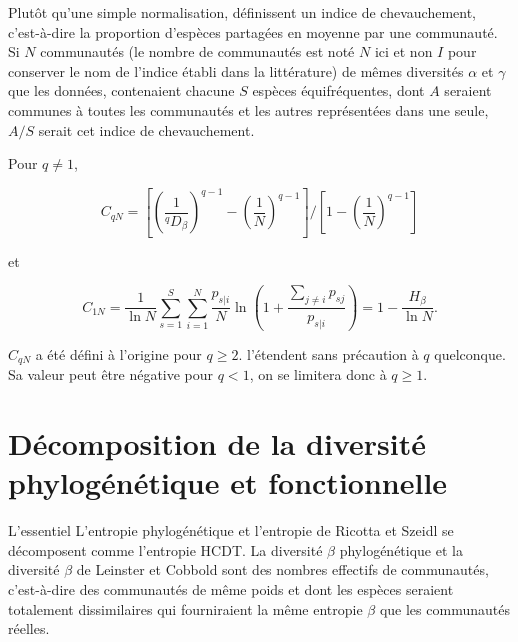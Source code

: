 \documentclass[
  11pt,
  french,
  a4paper,
  extrafontsizes,onecolumn,openright
  ]{memoir}
\newenvironment{Summary}
  {\begin{bclogo}[logo=\bctrombone, noborder=true, couleur=lightgray!50]{L'essentiel}\parindent0pt}
  {\end{bclogo}}
\begin{document}
Plutôt qu'une simple normalisation, \textcite{Chao2008} définissent un indice de chevauchement, c'est-à-dire la proportion d'espèces partagées en moyenne par une communauté.
Si \(N\) communautés (le nombre de communautés est noté \(N\) ici et non \(I\) pour conserver le nom de l'indice établi dans la littérature) de mêmes diversités \(\alpha\) et \(\gamma\) que les données, contenaient chacune \(S\) espèces équifréquentes, dont \(A\) seraient communes à toutes les communautés et les autres représentées dans une seule, \(A/S\) serait cet indice de chevauchement.

Pour \(q\ne 1\),

\begin{equation}
  \label{eq:Chao2008q}
  C_{qN} = {\left[{\left(\frac{1}{^{q}\!D_{\beta}}\right)}^{q-1}-{\left(\frac{1}{N}\right)}^{q-1}\right]}/{\left[1-{\left(\frac{1}{N}\right)}^{q-1}\right]}
\end{equation}

et

\begin{equation}
  \label{eq:C1N}
  C_{1N} 
  =\frac{1}{\ln{N}}\sum^S_{s=1}{\sum^N_{i=1}{\frac{p_{s|i}}{N}\ln\left(1+\frac{\sum_{j\ne i}{p_{sj}}}{p_{s|i}}\right)}}
  =1-\frac{H_{\beta}}{\ln{N}}.
\end{equation}

\(C_{qN}\) a été défini à l'origine pour \(q\ge 2\).
\textcite{Chao2012a} l'étendent sans précaution à \(q\) quelconque.
Sa valeur peut être négative pour \(q<1\), on se limitera donc à \(q \ge 1\).

\hypertarget{duxe9composition-de-la-diversituxe9-phyloguxe9nuxe9tique-et-fonctionnelle}{%
\chapter{Décomposition de la diversité phylogénétique et fonctionnelle}\label{duxe9composition-de-la-diversituxe9-phyloguxe9nuxe9tique-et-fonctionnelle}}

\scriptsize

\begin{Summary}
L'entropie phylogénétique et l'entropie de Ricotta et Szeidl se
décomposent comme l'entropie HCDT. La diversité \(\beta\) phylogénétique
et la diversité \(\beta\) de Leinster et Cobbold sont des nombres
effectifs de communautés, c'est-à-dire des communautés de même poids et
dont les espèces seraient totalement dissimilaires qui fourniraient la
même entropie \(\beta\) que les communautés réelles.
\end{Summary}
\end{document}
